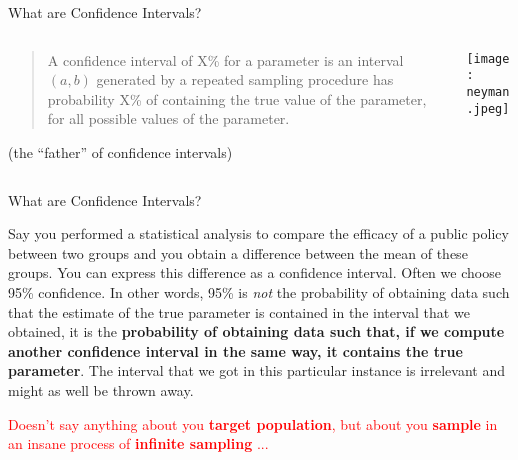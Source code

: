 \begin{frame}{What are Confidence Intervals?
	}
	\begin{columns}
		\begin{column}{0.8\textwidth}
			\begin{defn}
				\begin{quotation}
					A confidence interval of X\% for a parameter is an interval $(a, b)$ generated by a repeated sampling procedure has probability X\% of containing the true value of the parameter, for all possible values of the parameter.
				\end{quotation}
				\vfill \vfill
				\textcite{neyman1937outline} (the ``father'' of confidence intervals)
			\end{defn}
		\end{column}
		\begin{column}{0.2\textwidth}
			\centering
			\texttt{[image: neyman.jpeg]}
		\end{column}
	\end{columns}
\end{frame}

\begin{frame}{What are Confidence Intervals?}
	\begin{example}
		Say you performed a statistical analysis to compare
		the efficacy of a public policy between two groups and you obtain a
		difference between the mean of these groups.
		You can express this difference as a confidence interval.
		Often we choose 95\% confidence.
		In other words, 95\% is \textit{not} the probability of obtaining data such that the estimate of the true parameter is contained in the interval that we obtained, it is the \textbf{probability of obtaining data such that, if we compute another confidence interval in the same way, it contains the true parameter}.
		The interval that we got in this particular instance is irrelevant and might as well be thrown away.
	\end{example}
	\footnotesize \textcolor{red}{Doesn't say anything about you \textbf{target population},
		but about you \textbf{sample} in an insane process of \textbf{infinite sampling} ...}
\end{frame}


